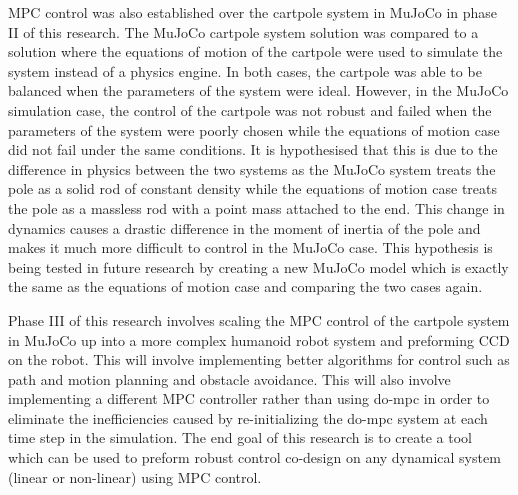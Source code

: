 \documentclass{./springer/svjour3}
\begin{document}
MPC control was also established over the cartpole system in MuJoCo in phase II of this research. The MuJoCo cartpole system solution was compared to a solution
where the equations of motion of the cartpole were used to simulate the system instead of a physics engine. In both cases, the cartpole was able to be balanced when the 
parameters of the system were ideal. However, in the MuJoCo simulation case, the control of the cartpole was not robust and failed when the parameters of the system were
poorly chosen while the equations of motion case did not fail under the same conditions. It is hypothesised that this is due to the difference in physics 
between the two systems as the MuJoCo system treats the pole as a solid rod of constant density while the equations of motion case treats the pole as a massless rod with a point mass 
attached to the end. This change in dynamics causes a drastic difference in the moment of inertia of the pole and makes it much more difficult to control in the 
MuJoCo case. This hypothesis is being tested in future research by creating a new MuJoCo model which is exactly the same as the equations of motion case 
and comparing the two cases again.

Phase III of this research involves scaling the MPC control of the cartpole system in MuJoCo up into a more complex humanoid robot system and preforming CCD on the robot. 
This will involve implementing better algorithms for control such as path and motion planning and obstacle avoidance. This will also involve implementing a different 
MPC controller rather than using do-mpc in order to eliminate the inefficiencies caused by re-initializing the do-mpc system at each time step in the simulation. The end 
goal of this research is to create a tool which can be used to preform robust control co-design on any dynamical system (linear or non-linear) using MPC control.

\pagestyle{plain}
\normalsize

\end{document}
